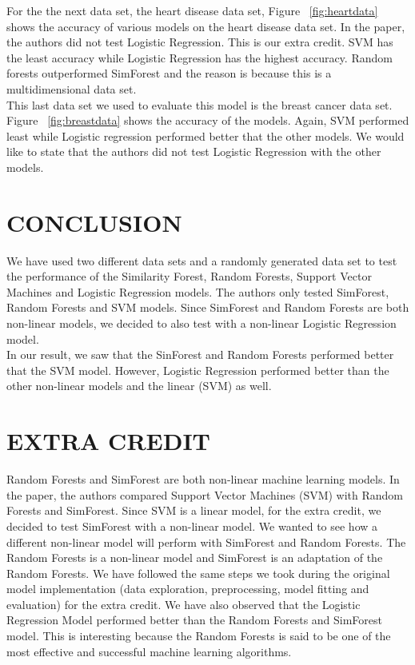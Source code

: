 \documentclass{article}
\begin{document}
\noindent For the the next data set, the heart disease data set, 
Figure ~\ref{fig:heartdata} shows the accuracy of various models on the heart disease data set. In the paper, the authors did not test Logistic Regression. This is our extra credit. SVM has the least accuracy while Logistic Regression has the highest accuracy. Random forests outperformed SimForest and the reason is because this is a multidimensional data set.\\

\noindent This last data set we used to evaluate this model is the breast cancer data set. Figure ~\ref{fig:breastdata} shows the accuracy of the models. Again, SVM performed least while Logistic regression performed better that the other models. We would like to state that the authors did not test Logistic Regression with the other models.\\

\section{CONCLUSION}
We have used two different data sets and a randomly generated data set to test the performance of the Similarity Forest, Random Forests, Support Vector Machines and Logistic Regression models. The authors only tested SimForest, Random Forests and SVM models. Since SimForest and Random Forests are both non-linear models, we decided to also test with a non-linear Logistic Regression model.\\

In our result, we saw that the SinForest and Random Forests performed better that the SVM model. However, Logistic Regression performed better than the other non-linear models and the linear (SVM) as well. 



\section{EXTRA CREDIT}

Random Forests and SimForest are both non-linear machine learning models. In the paper, the authors compared Support Vector Machines (SVM) with Random Forests and SimForest. Since SVM is a linear model, for the extra credit, we decided to test SimForest with a non-linear model. We wanted to see how a different non-linear model will perform with SimForest and Random Forests. The Random Forests is a non-linear model and SimForest is an adaptation of the Random Forests. We have followed the same steps we took during the original model implementation (data exploration, preprocessing, model fitting and evaluation) for the extra credit. We have also observed that the Logistic Regression Model performed better than the Random Forests and SimForest model. This is interesting because the Random Forests is said to be one of the most effective and successful machine learning algorithms. \\
\end{document}
